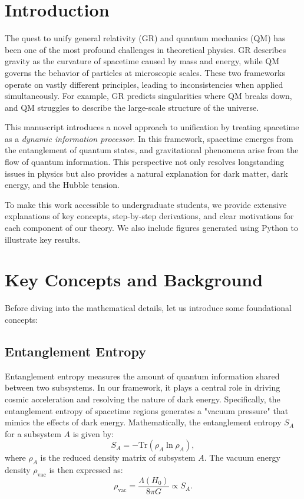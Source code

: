 \documentclass[12pt, a4paper]{article}
\begin{document}
\section{Introduction}
The quest to unify general relativity (GR) and quantum mechanics (QM) has been one of the most profound challenges in theoretical physics. GR describes gravity as the curvature of spacetime caused by mass and energy, while QM governs the behavior of particles at microscopic scales. These two frameworks operate on vastly different principles, leading to inconsistencies when applied simultaneously. For example, GR predicts singularities where QM breaks down, and QM struggles to describe the large-scale structure of the universe.

This manuscript introduces a novel approach to unification by treating spacetime as a \textit{dynamic information processor}. In this framework, spacetime emerges from the entanglement of quantum states, and gravitational phenomena arise from the flow of quantum information. This perspective not only resolves longstanding issues in physics but also provides a natural explanation for dark matter, dark energy, and the Hubble tension.

To make this work accessible to undergraduate students, we provide extensive explanations of key concepts, step-by-step derivations, and clear motivations for each component of our theory. We also include figures generated using Python to illustrate key results.

\section{Key Concepts and Background}
Before diving into the mathematical details, let us introduce some foundational concepts:

\subsection{Entanglement Entropy}
Entanglement entropy measures the amount of quantum information shared between two subsystems. In our framework, it plays a central role in driving cosmic acceleration and resolving the nature of dark energy. Specifically, the entanglement entropy of spacetime regions generates a "vacuum pressure" that mimics the effects of dark energy. Mathematically, the entanglement entropy \(S_A\) for a subsystem \(A\) is given by:
\[
S_A = -\text{Tr}(\rho_A \ln \rho_A),
\]
where \(\rho_A\) is the reduced density matrix of subsystem \(A\). The vacuum energy density \(\rho_{\text{vac}}\) is then expressed as:
\[
\rho_{\text{vac}} = \frac{\Lambda(H_0)}{8\pi G} \propto S_A.
\]
\end{document}

